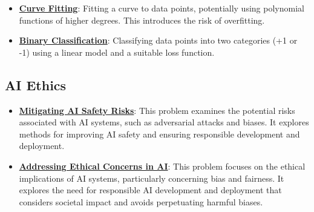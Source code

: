\documentclass{article}%
\begin{document}
\begin{itemize}[leftmargin=*]
\item \href{\url{https://purdue.brightspace.com/d2l/common/assets/pdfjs-d2l-dist/1.0.14-legacy/web/viewer.html?file=\%252Fcontent\%252Fenforced\%252F1095467-wl.202510.CS.24300.001\%252F05L2-ML\%20Basics.pdf\%253Fou\%253D1095467\&lang=en-us\&container=d2l-fileviewer-rendered-pdf\&fullscreen=d2l-fileviewer-rendered-pdf-dialog\&height=667}#page=13}{\textbf{Curve Fitting}}: Fitting a curve to data points, potentially using polynomial functions of higher degrees. This introduces the risk of overfitting.%
\item \href{\url{https://purdue.brightspace.com/d2l/common/assets/pdfjs-d2l-dist/1.0.14-legacy/web/viewer.html?file=\%252Fcontent\%252Fenforced\%252F1095467-wl.202510.CS.24300.001\%252F05L2-ML\%20Basics.pdf\%253Fou\%253D1095467\&lang=en-us\&container=d2l-fileviewer-rendered-pdf\&fullscreen=d2l-fileviewer-rendered-pdf-dialog\&height=667}#page=20}{\textbf{Binary Classification}}: Classifying data points into two categories (+1 or -1) using a linear model and a suitable loss function.%
\end{itemize}

%
\subsection{AI Ethics}%
\label{subsec:AIEthics}%
\begin{itemize}[leftmargin=*]%
\item \href{\url{https://purdue.brightspace.com/d2l/common/assets/pdfjs-d2l-dist/1.0.14-legacy/web/viewer.html?file=\%252Fcontent\%252Fenforced\%252F1095467-wl.202510.CS.24300.001\%252F02L2-Intro.pdf\%253Fou\%253D1095467\&lang=en-us\&container=d2l-fileviewer-rendered-pdf\&fullscreen=d2l-fileviewer-rendered-pdf-dialog\&height=667}#page=19}{\textbf{Mitigating AI Safety Risks}}: This problem examines the potential risks associated with AI systems, such as adversarial attacks and biases. It explores methods for improving AI safety and ensuring responsible development and deployment.%
\item \href{\url{https://purdue.brightspace.com/d2l/common/assets/pdfjs-d2l-dist/1.0.14-legacy/web/viewer.html?file=\%252Fcontent\%252Fenforced\%252F1095467-wl.202510.CS.24300.001\%252F02L2-Intro.pdf\%253Fou\%253D1095467\&lang=en-us\&container=d2l-fileviewer-rendered-pdf\&fullscreen=d2l-fileviewer-rendered-pdf-dialog\&height=667}#page=20}{\textbf{Addressing Ethical Concerns in AI}}: This problem focuses on the ethical implications of AI systems, particularly concerning bias and fairness. It explores the need for responsible AI development and deployment that considers societal impact and avoids perpetuating harmful biases.%
\end{itemize}
\end{document}
